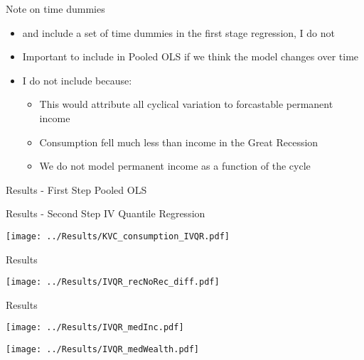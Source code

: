 \documentclass{beamer}
\begin{document}
 \begin{frame}{Note on time dummies}
	\begin{itemize}
		
		\item \cite{BPP} and \cite{KaplanViolante2014} include a set of time dummies in the first stage regression, I do not
		\item Important to include  in Pooled OLS if we think the model changes over time
		\item I do not include because:
		\begin{itemize}
			\item This would attribute all cyclical variation to forcastable permanent income
			\item Consumption fell much less than income in the Great Recession
			\item We do not model permanent income as a function of the cycle
		\end{itemize}
	\end{itemize}
\end{frame}



 \begin{frame}{Results - First Step Pooled OLS}
 	\begin{center}
 		\resizebox{0.4\textwidth}{!}{
	}
 	\end{center}
	\end{frame}


 \begin{frame}{Results - Second Step IV Quantile Regression}
\begin{center}
	\texttt{[image: ../Results/KVC\_consumption\_IVQR.pdf]}
\end{center}

	
\end{frame}

 \begin{frame}{Results}
 	\begin{center}

		\texttt{[image: ../Results/IVQR\_recNoRec\_diff.pdf]}
	\end{center}

\end{frame}


 \begin{frame}{Results}
	\begin{center}
	\begin{minipage}[b]{0.45\linewidth}
	\centering
	\texttt{[image: ../Results/IVQR\_medInc.pdf]}
			\end{minipage}
			\begin{minipage}[b]{0.45\linewidth}
			\centering
			\texttt{[image: ../Results/IVQR\_medWealth.pdf]}
		\end{minipage}
	\end{center}
	
\end{frame}
\end{document}
